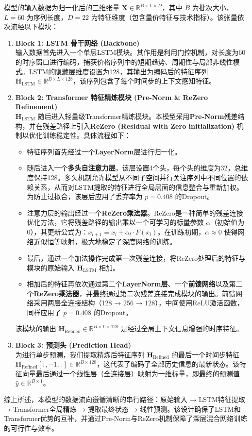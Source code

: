 \documentclass[UTF8,AutoFakeBold=1,AutoFakeSlant,zihao=-4]{SCAU}
\begin{document}
\FloatBarrier

模型的输入数据为归一化后的三维张量 $\mathbf{X} \in \mathbb{R}^{B \times L \times D}$，其中 $B$ 为批次大小，$L=60$ 为序列长度，$D=22$ 为特征维度（包含量价特征与技术指标）。该张量依次流经以下模块：
\begin{enumerate}
  \item \textbf{Block 1: LSTM 骨干网络 (Backbone)} \\
        输入数据首先进入一个单层LSTM模块。其作用是利用门控机制，对长度为60的时序窗口进行编码，捕获价格序列中的短期趋势、周期性与局部非线性模式。LSTM的隐藏层维度设置为128，其输出为编码后的特征序列 $\mathbf{H}_{\text{LSTM}} \in \mathbb{R}^{B \times L \times 128}$，该序列包含了每个时间步的上下文感知特征。
  \item \textbf{Block 2: Transformer 特征精炼模块 (Pre-Norm \& ReZero Refinement)} \\
        $\mathbf{H}_{\text{LSTM}}$ 随后进入轻量级Transformer精炼模块。本模型采用\textbf{Pre-Norm}残差结构，并在残差路径上引入\textbf{ReZero (Residual with Zero initialization)} 机制以优化训练稳定性。具体流程如下：
        \begin{itemize}
          \item 特征序列首先经过一个\textbf{LayerNorm}层进行归一化。
          \item 随后进入一个\textbf{多头自注意力层}。该层设置4个头，每个头的维度为32，总维度保持128。多头机制允许模型从不同子空间并行关注序列中不同位置的依赖关系，从而对LSTM提取的特征进行全局层面的信息整合与重新加权。为防止过拟合，该层后应用了丢弃率为 $p=0.408$ 的Dropout。
          \item 注意力层的输出经过一个\textbf{ReZero乘法器}。ReZero是一种简单的残差连接优化方法，它将残差路径的输出乘以一个可学习的标量参数 $\alpha$（初始值为0），其更新公式为：$x_{l+1} = x_l + \alpha_l \cdot F(x_l)$。在训练初期，$\alpha \approx 0$ 使得网络近似恒等映射，极大地稳定了深度网络的训练。
          \item 最后，通过一个加法操作完成第一次残差连接，将ReZero处理后的特征与模块的原始输入 $\mathbf{H}_{\text{LSTM}}$ 相加。
          \item 相加后的特征再依次通过第二个\textbf{LayerNorm层}、一个\textbf{前馈网络}以及第二个\textbf{ReZero乘法器}，并最终通过第二次残差连接完成模块的输出。前馈网络采用两层全连接结构（128 → 256 → 128），中间使用ReLU激活函数，同样应用了 $p=0.408$ 的Dropout。
        \end{itemize}
        该模块的输出 $\mathbf{H}_{\text{Refined}} \in \mathbb{R}^{B \times L \times 128}$ 是经过全局上下文信息增强的时序特征。
  \item \textbf{Block 3: 预测头 (Prediction Head)} \\
        为进行单步预测，我们提取精炼后特征序列 $\mathbf{H}_{\text{Refined}}$ 的最后一个时间步特征 $\mathbf{H}_{\text{Refined}}[:, -1, :] \in \mathbb{R}^{B \times 128}$，这代表了编码了全部历史信息的最新状态。该特征向量最后通过一个线性层（全连接层）映射为一维标量，即最终的预测值 $\hat{y} \in \mathbb{R}^{B \times 1}$。
\end{enumerate}
综上所述，本模型的数据流向遵循清晰的串行路径：原始输入 → LSTM特征提取 → Transformer全局精炼 → 提取最终状态 → 线性预测。该设计确保了LSTM和Transformer优势的互补，并通过Pre-Norm与ReZero机制保障了深层混合网络训练的可行性与效率。
\end{document}
